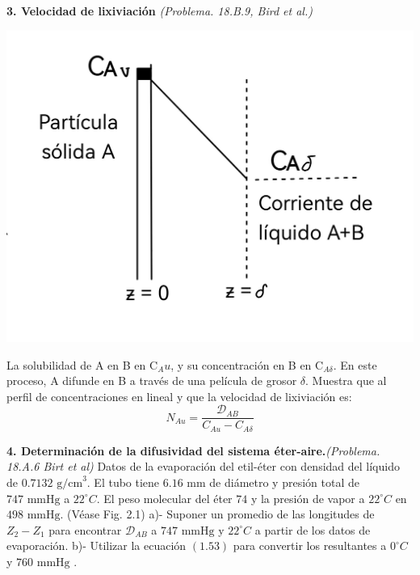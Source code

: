 \flushleft
\textbf{3. Velocidad de lixiviación} \textit{(Problema. 18.B.9, Bird et al.)}
\flushleft
\begin{minipage}{0.4\textwidth} %
    \includegraphics[width=\linewidth]{./Capitulo2/Imagenes/imagen-3.jpg} %
\end{minipage}
\hfill %
\begin{minipage}{0.5\textwidth} %
La solubilidad de A en B en C$_Au$, y su concentración en B en C$_{A\delta}$. En este proceso, A difunde en B a través de una película de grosor $\delta$. Muestra que al perfil de concentraciones en lineal y que la velocidad de lixiviación es: \[N_{Au}= \frac{\mathscr{D}_{AB}}{C_{Au}-C_{A\delta}}\]
\end{minipage}
\vspace{0.1cm} %
\flushleft

\textbf{4. Determinación de la difusividad del sistema éter-aire.}\textit{(Problema. 18.A.6 Birt et al)}
\vspace{0.2cm}
\flushleft
Datos de la evaporación del etil-éter con densidad del líquido de $0.7132 \text{ g/cm}^3$. El tubo tiene $6.16 \text{ mm}$ de diámetro y presión total de $747 \text{ mmHg}$  a $22^\circ C$. El peso molecular del éter $74$  y la presión de vapor a $22^\circ C$ en $498 \text{ mmHg}$. (Véase Fig. 2.1)
\vspace{0.2cm}
\flushleft
a)- Suponer un promedio de las longitudes de $Z_2 - Z_1$ para encontrar $\mathscr{D}_{AB}$ a $747 \text{ mmHg}$ y $22^\circ C$ a partir de los datos de evaporación.
\flushleft
b)- Utilizar la ecuación $(1.53)$ para convertir los resultantes a $0^\circ C$ y $760\text{ mmHg}$ .


